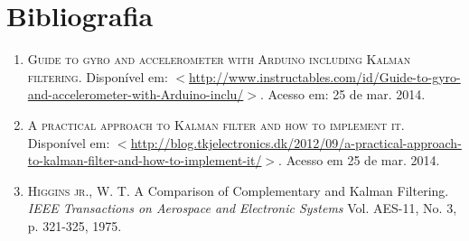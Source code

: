 \documentclass[a4paper,12pt]{article}
\begin{document}
\section{Bibliografia}

\begin{enumerate}
\item \textsc{Guide to gyro and accelerometer with Arduino including Kalman filtering.} Disponível em: \href{http://www.instructables.com/id/Guide-to-gyro-and-accelerometer-with-Arduino-inclu}{$<$http://www.instructables.com/id/Guide-to-gyro-and-accelerometer-with-Arduino-inclu/$>$}. Acesso em: 25 de mar. 2014.

\item \textsc{A practical approach to Kalman filter and how to implement it.} Disponível em: \href{http://blog.tkjelectronics.dk/2012/09/a-practical-approach-to-kalman-filter-and-how-to-implement-it/}{$<$http://blog.tkjelectronics.dk/2012/09/a-practical-approach-to-kalman-filter-and-how-to-implement-it/$>$}. Acesso em 25 de mar. 2014.

\item \textsc{Higgins jr.}, W. T. A Comparison of Complementary and Kalman Filtering. \textit{IEEE Transactions on Aerospace and Electronic Systems} Vol. AES-11, No. 3, p. 321-325, 1975.

\end{enumerate}
\end{document}

